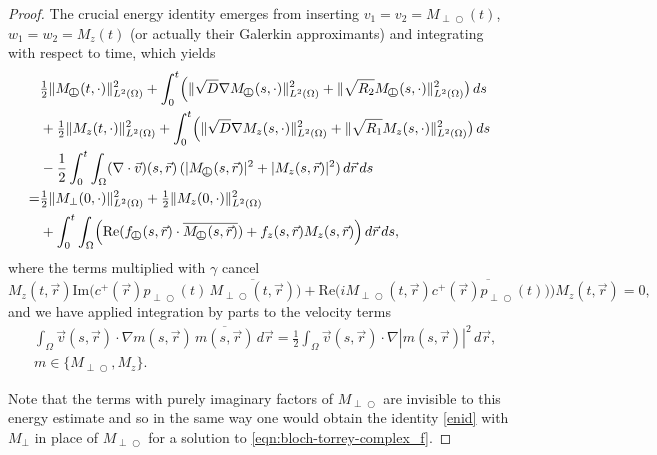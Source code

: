 \documentclass{ws-m3as}
\renewcommand\Re{\mathrm{Re}}
\renewcommand\Im{\mathrm{Im}}
\def\Mpp{M_{\perp\!\!\!\!\!\bigcirc}}
\def\pp{p_{\perp\!\!\!\!\!\bigcirc}}
\def\fpp{f_{\perp\!\!\!\!\!\bigcirc}}
\begin{document}
\begin{proof}
The crucial energy identity emerges from inserting $v_1=v_2=\Mpp(t)$, $w_1=w_2=M_z(t)$ (or actually their Galerkin approximants)  and integrating with respect to time, which yields
\begin{equation}\label{enid}
\begin{aligned}
&\tfrac12\|\Mpp(t, \cdot)\|_{L^2(\Omega)}^2
+\int_0^t\Bigl(\|\sqrt{D}\nabla \Mpp(s,\cdot)\|_{L^2(\Omega)}^2+\|\sqrt{R_2}\Mpp(s,\cdot)\|_{L^2(\Omega)}^2\bigr)\, ds\\
&+\tfrac12\|M_z(t, \cdot)\|_{L^2(\Omega)}^2+\int_0^t\Bigl(\|\sqrt{D}\nabla M_z(s,\cdot)\|_{L^2(\Omega)}^2+\|\sqrt{R_1}M_z(s,\cdot)\|_{L^2(\Omega)}^2\bigr)\, ds\\
&-\frac12 \int_0^t\int_\Omega (\nabla\cdot{\vec v})(s, \vec r)\,(|\Mpp(s, \vec r)|^2+|M_z(s, \vec r)|^2)\, d \vec r\, ds\\
=& \tfrac12\|M_\perp(0, \cdot)\|_{L^2(\Omega)}^2+\tfrac12\|M_z(0, \cdot)\|_{L^2(\Omega)}^2\\
&+\int_0^t\int_\Omega\Bigl(\Re ( \fpp(s, \vec r) \cdot\overline{\Mpp(s, \vec r)})+f_z (s, \vec r) M_z(s, \vec r)\Bigr)\, d \vec r\, ds,
\end{aligned}
\end{equation}
where the terms multiplied with $\gamma$ cancel
\[
M_z(t,\vec r)\Im\bigl(c^+(\vec r)\pp(t)\, \overline{\Mpp(t,\vec r)}\bigr)
+\Re\bigl(i\Mpp(t,\vec r)\overline{c^+(\vec r)\pp(t)}\bigr)\Bigr)M_z(t,\vec r)=0,
\]
and we have applied integration by parts to the velocity terms 
\[
\begin{aligned}
&\int_\Omega {\vec v}(s, \vec r)\cdot \nabla m(s, \vec r)\, \overline{m(s, \vec r)}\, d \vec r
=\frac12\int_\Omega {\vec v}(s, \vec r)\cdot \nabla |m(s, \vec r)|^2\, d \vec r,\\
&m\in\{\Mpp,M_z\}.
\end{aligned}
\]

Note that the terms with purely imaginary factors of $\Mpp$ are invisible to this energy estimate and so in the same way one would obtain the identity \eqref{enid} with $M_\perp$ in place of $\Mpp$ for a solution to \eqref{eqn:bloch-torrey-complex_f}.


\end{proof}
\end{document}
